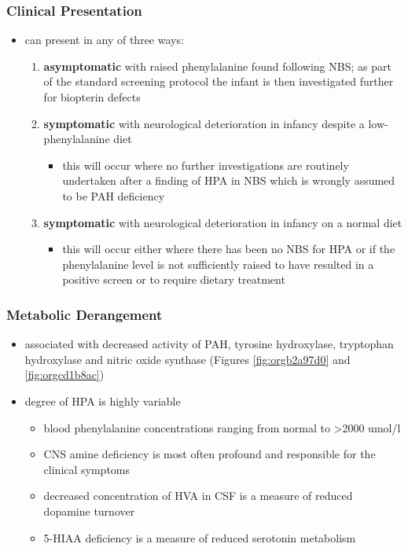 \documentclass{scrartcl}
\begin{document}
\subsubsection{Clinical Presentation}
\label{sec:orga5c144e}
\begin{itemize}
\item can present in any of three ways:
\begin{enumerate}
\item \textbf{asymptomatic} with raised phenylalanine found following NBS; as part of
the standard screening protocol the infant is then investigated
further for biopterin defects
\item \textbf{symptomatic} with neurological deterioration in infancy despite a
low-phenylalanine diet
\begin{itemize}
\item this will occur where no further investigations are routinely
undertaken after a finding of HPA in NBS which is wrongly
assumed to be PAH deficiency
\end{itemize}
\item \textbf{symptomatic} with neurological deterioration in infancy on a
normal diet
\begin{itemize}
\item this will occur either where there has been no NBS for HPA or
if the phenylalanine level is not sufficiently raised to have
resulted in a positive screen or to require dietary treatment
\end{itemize}
\end{enumerate}
\end{itemize}
\subsubsection{Metabolic Derangement}
\label{sec:org6f99579}
\begin{itemize}
\item associated with decreased activity of PAH, tyrosine hydroxylase,
tryptophan hydroxylase and nitric oxide synthase (Figures \ref{fig:orgb2a97d0}
and \ref{fig:orgcd1b8ac})
\item degree of HPA is highly variable
\begin{itemize}
\item blood phenylalanine concentrations ranging from normal to \textgreater{}2000
umol/l
\item CNS amine deficiency is most often profound and responsible for
the clinical symptoms
\item decreased concentration of HVA in CSF is a measure of reduced
dopamine turnover
\item 5-HIAA deficiency is a measure of reduced serotonin metabolism
\end{itemize}
\end{itemize}
\end{document}
